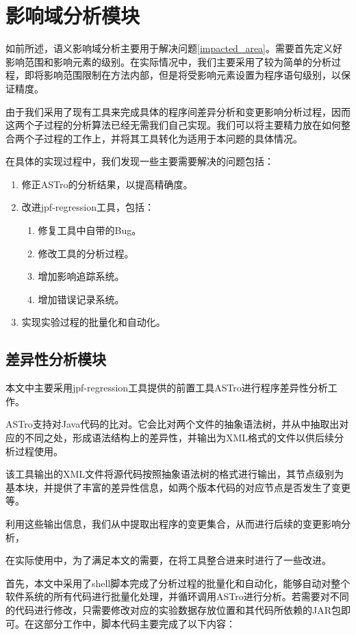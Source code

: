 \section{影响域分析模块}

如前所述，语义影响域分析主要用于解决问题\ref {impacted_area}。需要首先定义好影响范围和影响元素的级别。在实际情况中，我们主要采用了较为简单的分析过程，即将影响范围限制在方法内部，但是将受影响元素设置为程序语句级别，以保证精度。

由于我们采用了现有工具来完成具体的程序间差异分析和变更影响分析过程，因而这两个子过程的分析算法已经无需我们自己实现。我们可以将主要精力放在如何整合两个子过程的工作上，并将其工具转化为适用于本问题的具体情况。

在具体的实现过程中，我们发现一些主要需要解决的问题包括：
\begin{enumerate}
	\item 修正ASTro的分析结果，以提高精确度。
	\item 改进jpf-regression工具，包括：
		\begin{enumerate}
			\item 修复工具中自带的Bug。
			\item 修改工具的分析过程。
			\item 增加影响追踪系统。
			\item 增加错误记录系统。
		\end{enumerate}
	
	\item 实现实验过程的批量化和自动化。
\end{enumerate}

\subsection{差异性分析模块}

本文中主要采用jpf-regression工具提供的前置工具ASTro进行程序差异性分析工作。

ASTro支持对Java代码的比对。它会比对两个文件的抽象语法树，并从中抽取出对应的不同之处，形成语法结构上的差异性，并输出为XML格式的文件以供后续分析过程使用。

该工具输出的XML文件将源代码按照抽象语法树的格式进行输出，其节点级别为基本块，并提供了丰富的差异性信息，如两个版本代码的对应节点是否发生了变更等。

利用这些输出信息，我们从中提取出程序的变更集合，从而进行后续的变更影响分析，

在实际使用中，为了满足本文的需要，在将工具整合进来时进行了一些改进。

首先，本文中采用了shell脚本完成了分析过程的批量化和自动化，能够自动对整个软件系统的所有代码进行批量化处理，并循环调用ASTro进行分析。若需要对不同的代码进行修改，只需要修改对应的实验数据存放位置和其代码所依赖的JAR包即可。在这部分工作中，脚本代码主要完成了以下内容：

